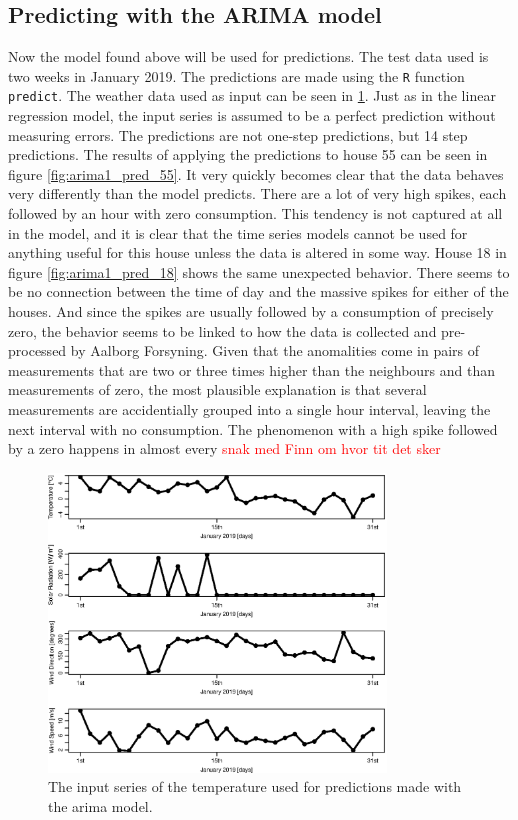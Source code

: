 \subsection{Predicting with the ARIMA model}
Now the model found above will be used for predictions. The test data used is two weeks in January 2019. The predictions are made using the \texttt{R} function \texttt{predict}. The  weather data used as input can be seen in \cref{fig:weather_pred_hour}. Just as in the linear regression model, the input series is assumed to be a perfect prediction without measuring errors. The predictions are not one-step predictions, but 14 step predictions. The results of applying the predictions to house 55 can be seen in figure \cref{fig:arima1_pred_55}. It very quickly becomes clear that the data behaves very differently than the model predicts. There are a lot of very high spikes, each followed by an hour with zero consumption. This tendency is not captured at all in the model, and it is clear that the time series models cannot be used for anything useful for this house unless the data is altered in some way. House 18 in figure \cref{fig:arima1_pred_18} shows the same unexpected behavior. There seems to be no connection between the time of day and the massive spikes for either of the houses. And since the spikes are usually followed by a consumption of precisely zero, the behavior seems to be linked to how the data is collected and pre-processed by Aalborg Forsyning. Given that the anomalities come in pairs of measurements that are two or three times higher than the neighbours and than measurements of zero, the most plausible explanation is that several measurements are accidentially grouped into a single hour interval, leaving the next interval with no consumption. The phenomenon with a high spike followed by a zero happens in almost every \textcolor{red}{snak med Finn om hvor tit det sker}

\begin{figure}
    \centering
    \includegraphics[width=0.8\textwidth]{../../../figures/TestWeatherDay.eps}
    \caption{The input series of the temperature used for predictions made with the arima model.}
    \label{fig:weather_pred_hour}
\end{figure}


